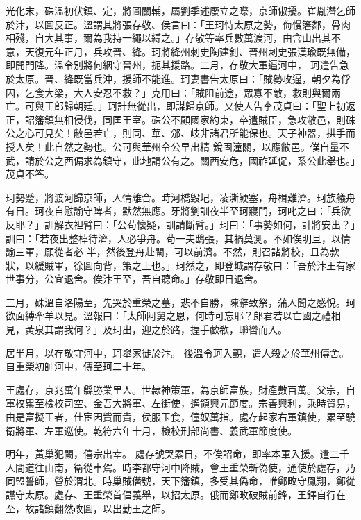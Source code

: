 \begin{pinyinscope}
 光化末，硃溫初伏鎮、定，將圖關輔，屬劉季述廢立之際，京師俶擾。崔胤潛乞師於汴，以圖反正。溫謂其將張存敬、侯言曰：「王珂恃太原之勢，侮慢籓鄰，骨肉相殘，自大其事，爾為我持一繩以縛之。」存敬等率兵數萬渡河，由含山出其不意，天復元年正月，兵攻晉、絳。珂將絳州刺史陶建釗、晉州刺史張漢瑜既無備，即開門降。溫令別將何絪守晉州，扼其援路。二月，存敬大軍逼河中，
 珂遣告急於太原。晉、絳既當兵沖，援師不能進。珂妻書告太原曰：「賊勢攻逼，朝夕為俘囚，乞食大梁，大人安忍不救？」克用曰：「賊阻前途，眾寡不敵，救則與爾兩亡。可與王郎歸朝廷。」珂計無從出，即謀歸京師。又使人告李茂貞曰：「聖上初返正，詔籓鎮無相侵伐，同匡王室。硃公不顧國家約束，卒遣賊臣，急攻敝邑，則硃公之心可見矣！敝邑若亡，則同、華、邠、岐非諸君所能保也。天子神器，拱手而授人矣！此自然之勢也。公可與華州令公早出精
 銳固潼關，以應敝邑。僕自量不武，請於公之西偏求為鎮守，此地請公有之。關西安危，國祚延促，系公此舉也。」茂貞不答。



 珂勢蹙，將渡河歸京師，人情離合。時河橋毀圮，凌澌鯁塞，舟楫難濟。珂族艤舟有日。珂夜自慰諭守陴者，默然無應。牙將劉訓夜半至珂寢門，珂叱之曰：「兵欲反耶？」訓解衣袒臂曰：「公茍懷疑，訓請斷臂。」珂曰：「事勢如何，計將安出？」訓曰：「若夜出整棹待濟，人必爭舟。茍一夫鴟張，其禍莫測。不如俟明旦，以情諭三軍，願從者必
 半，然後登舟赴闕，可以前濟。不然，則召諸將校，且為款狀，以緩賊軍，徐圖向背，策之上也。」珂然之，即登城謂存敬曰：「吾於汴王有家世事分，公宜退舍。俟汴王至，吾自聽命。」存敬即日退舍。



 三月，硃溫自洛陽至，先哭於重榮之墓，悲不自勝，陳辭致祭，蒲人聞之感悅。珂欲面縛牽羊以見。溫報曰：「太師阿舅之恩，何時可忘耶？郎君若以亡國之禮相見，黃泉其謂我何？」及珂出，迎之於路，握手歔欷，聯轡而入。



 居半月，以存敬守河中，珂舉家徙於汴。
 後溫令珂入覲，遣人殺之於華州傳舍。自重榮初帥河中，傳至珂二十年。



 王處存，京兆萬年縣勝業里人。世隸神策軍，為京師富族，財產數百萬。父宗，自軍校累至檢校司空、金吾大將軍、左街使，遙領興元節度。宗善興利，乘時貿易，由是富擬王者，仕宦因貲而貴，侯服玉食，僮奴萬指。處存起家右軍鎮使，累至驍衛將軍、左軍巡使。乾符六年十月，檢校刑部尚書、義武軍節度使。



 明年，黃巢犯闕，僖宗出幸。
 處存號哭累日，不俟詔命，即率本軍入援。遣二千人間道往山南，衛從車駕。時李都守河中降賊，會王重榮斬偽使，通使於處存，乃同盟誓師，營於渭北。時巢賊僭號，天下籓鎮，多受其偽命，唯鄭畋守鳳翔，鄭從讜守太原。處存、王重榮首倡義舉，以招太原。俄而鄭畋破賊前鋒，王鐸自行在至，故諸鎮翻然改圖，以出勤王之師。




\end{pinyinscope}
